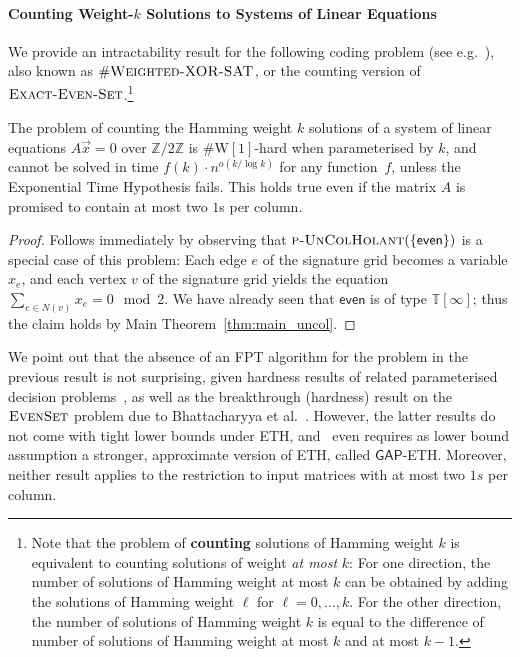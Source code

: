 \documentclass[authorcolumns,numberwithinsect]{no-lipics-v2022}
\newcommand{\W}{\mathrm{W}}
\begin{document}
\paragraph*{Counting Weight-$k$ Solutions to Systems of Linear Equations}
We provide an intractability result for the following coding problem (see e.g.\ \cite{BerlekampMT78,DowneyFVW99}), also known as $\#\textsc{Weighted-XOR-SAT}$, or the counting version of $\textsc{Exact-Even-Set}$.\footnote{Note that the problem of \textbf{counting} solutions of Hamming weight $k$ is equivalent to counting solutions of weight \emph{at most} $k$: For one direction, the number of solutions of Hamming weight at most $k$ can be obtained by adding the solutions of Hamming weight $\ell$ for $\ell=0,\dots,k$. For the other direction, the number of solutions of Hamming weight $k$ is equal to the difference of number of solutions of Hamming weight at most $k$ and at most $k-1$.} 

\begin{corollary}\label{cor:coding_hard}
    The problem of counting the Hamming weight $k$ solutions of a system of linear equations $A\vec{x}=0$ over $\mathbb{Z}/2\mathbb{Z}$ is $\#\W[1]$-hard when parameterised by $k$, and cannot be solved in time $f(k)\cdot n^{o(k/\log k)}$ for any function~$f$, unless the Exponential Time Hypothesis fails. This holds true even if the matrix $A$ is promised to contain at most two $1$s per column.
\end{corollary}
\begin{proof}
    Follows immediately by observing that $\textsc{p-UnColHolant}(\{\mathsf{even}\})$ is a special case of this problem: Each edge $e$ of the signature grid becomes a variable $x_e$, and each vertex $v$ of the signature grid yields the equation $\sum_{e\in N(v)}x_e = 0 \mod 2$.  We have already seen that $\mathsf{even}$ is of type $\mathbb{T}[\infty]$; thus the claim holds by Main Theorem~\ref{thm:main_uncol}.
\end{proof}
We point out that the absence of an FPT algorithm for the problem in the previous result is not surprising, given hardness results of related parameterised decision problems~\cite{DowneyFVW99}, as well as the breakthrough (hardness) result on the $\textsc{EvenSet}$ problem due to Bhattacharyya et al.\ \cite{BhattacharyyaGS18}. However, the latter results do not come with tight lower bounds under ETH, and~\cite{BhattacharyyaGS18} even requires as lower bound assumption a stronger, approximate version of ETH, called $\mathsf{GAP}$-ETH. Moreover, neither result applies to the restriction to input matrices with at most two $1s$ per column. 
\end{document}
